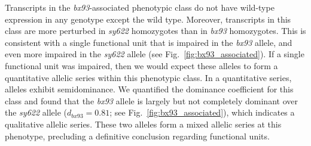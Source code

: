 \documentclass[10pt, twocolumn]{article}
\newcommand{\protein}[1]{\mbox{\uppercase{#1}}}
\begin{document}
Transcripts in the \emph{bx93}-associated phenotypic class do not have wild-type
expression in any genotype except the wild type. Moreover, transcripts in this
class are more perturbed in \emph{sy622} homozygotes than in \emph{bx93}
homozygotes. This is consistent with a single functional unit that is impaired
in the \emph{bx93} allele, and even more impaired in the \emph{sy622} allele
(see Fig.~\ref{fig:bx93_associated}). If a single functional unit was impaired,
then we would expect these alleles to form a quantitative allelic series within
this phenotypic class. In a quantitative series, alleles exhibit semidominance.
We quantified the dominance coefficient for this class and found that the
\emph{bx93} allele is largely but not completely dominant over the \emph{sy622}
allele ($d_{bx93}=0.81$; see Fig.~\ref{fig:bx93_associated}), which indicates
a qualitative allelic series. These two alleles form a mixed allelic series at
this phenotype, precluding a definitive conclusion regarding functional units.


%
\end{document}
